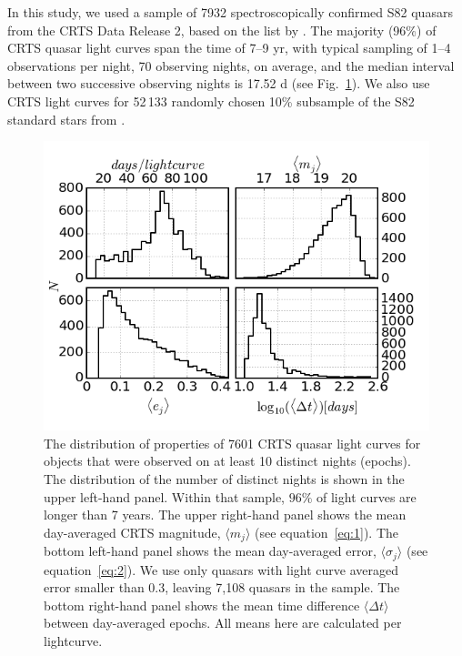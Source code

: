 \documentclass[fleqn,usenatbib]{mnras}
\begin{document}
In this study, we used a sample of 7932 spectroscopically confirmed S82 quasars from the CRTS Data Release 2, based 
on the list by \cite{macleod2012}.  The majority (96\%) of  CRTS quasar light curves span the time of 7--9 yr, 
with typical sampling of 1--4 observations per night, 70 observing nights, on average, and the 
median interval between two successive observing nights is 17.52  d (see Fig.~\ref{fig:1}). We also use CRTS light curves for 52$\,$133 randomly chosen 10\% subsample of the S82 
standard stars from \cite{ivezic2007}. 
\begin{figure}
\vskip -0.2in
\includegraphics[width=1.04\columnwidth]{Fig_1.png}
\vskip -0.1in
\caption{The distribution of properties of 7601 CRTS quasar light curves for objects that were observed 
on at least 10 distinct nights (epochs). The  distribution of the number of distinct nights is shown in the 
upper left-hand panel. Within that sample, $96\%$ of light curves are longer than 7 years.  The upper right-hand panel 
shows the mean day-averaged CRTS magnitude, $\langle  m_{j} \rangle$ (see equation~\ref{eq:1}). 
The bottom left-hand panel shows the  mean day-averaged error, $\langle \sigma_{j} \rangle$ (see equation~\ref{eq:2}). 
We use only quasars with light curve averaged error smaller than 0.3, leaving 7,108 quasars in the sample.
The bottom right-hand panel shows the mean time difference $\langle \Delta t \rangle$ between day-averaged epochs. 
All means here are calculated per lightcurve. }
\label{fig:1}
\end{figure}
\end{document}
